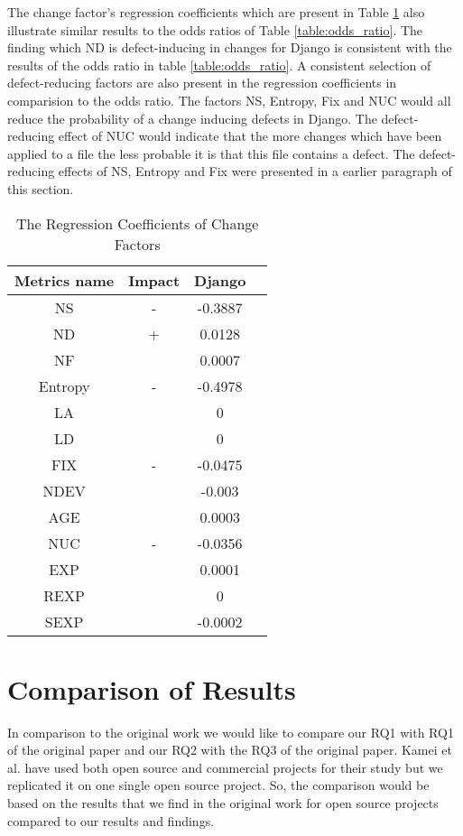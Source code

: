 \documentclass[10pt, conference]{IEEEtran}
\begin{document}
The change factor's regression coefficients which are present in Table \ref{table:regression_coefficients} also illustrate similar results to the odds ratios of Table \ref{table:odds_ratio}. The finding which ND is defect-inducing in changes for Django is consistent with the results of the odds ratio in table \ref{table:odds_ratio}. A consistent selection of defect-reducing factors are also present in the regression coefficients in comparision to the odds ratio. The factors NS, Entropy, Fix and NUC would all reduce the probability of a change inducing defects in Django. The defect-reducing effect of NUC would indicate that the more changes which have been applied to a file the less probable it is that this file contains a defect. The defect-reducing effects of NS, Entropy and Fix were presented in a earlier paragraph of this section.
\begin{table}
	\centering
	\caption{The Regression Coefficients of Change Factors}
	\begin{tabular}{|c|c|c|c|}
		\hline Metrics name & Impact & Django \\ 
		\hline NS & - & -0.3887 \\ 
		\hline ND & + & 0.0128 \\ 
		\hline NF &  & 0.0007 \\ 
		\hline Entropy & - & -0.4978 \\ 
		\hline LA &  & 0 \\ 
		\hline LD &  & 0 \\ 
		\hline FIX & - & -0.0475 \\ 
		\hline NDEV &  & -0.003 \\ 
		\hline AGE &  & 0.0003 \\ 
		\hline NUC & - & -0.0356 \\ 
		\hline EXP &  & 0.0001 \\ 
		\hline REXP &  & 0 \\ 
		\hline SEXP &  & -0.0002 \\ 
		\hline 
	\end{tabular}
	\label{table:regression_coefficients}
\end{table}


\section{Comparison of Results}
\label{sec:comparison-results}

In comparison to the original work we would like to compare our RQ1 with RQ1 of the original paper and our RQ2 with the RQ3 of the original paper. Kamei et al. have used  both open source and commercial projects for their study but we replicated it on one single open source project. So, the comparison would be based on the results that we find in the original work for open source projects compared to our results and findings.
\end{document}
